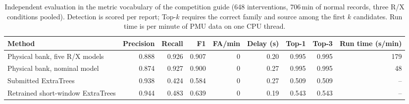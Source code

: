 \begin{table}[t]\centering\small
\caption{Independent evaluation in the metric vocabulary of the competition guide (648 interventions, 706\,min of normal records, three R/X conditions pooled). Detection is scored per report; Top-$k$ requires the correct family and source among the first $k$ candidates. Run time is per minute of PMU data on one CPU thread.}
\label{tab:competition-metrics}
\begin{tabular}{@{}lrrrrrrrr@{}}\toprule
Method & Precision & Recall & F1 & FA/min & Delay (s) & Top-1 & Top-3 & Run time (s/min)\\\midrule
Physical bank, five R/X models & 0.888 & 0.926 & 0.907 & 0 & 0.20 & 0.995 & 0.995 & 179\\
Physical bank, nominal model & 0.874 & 0.927 & 0.900 & 0 & 0.27 & 0.995 & 0.995 & 48\\
Submitted ExtraTrees & 0.938 & 0.424 & 0.584 & 0 & 0.27 & 0.509 & 0.509 & --\\
Retrained short-window ExtraTrees & 0.944 & 0.483 & 0.639 & 0 & 0.19 & 0.543 & 0.543 & --\\
\bottomrule\end{tabular}\end{table}
